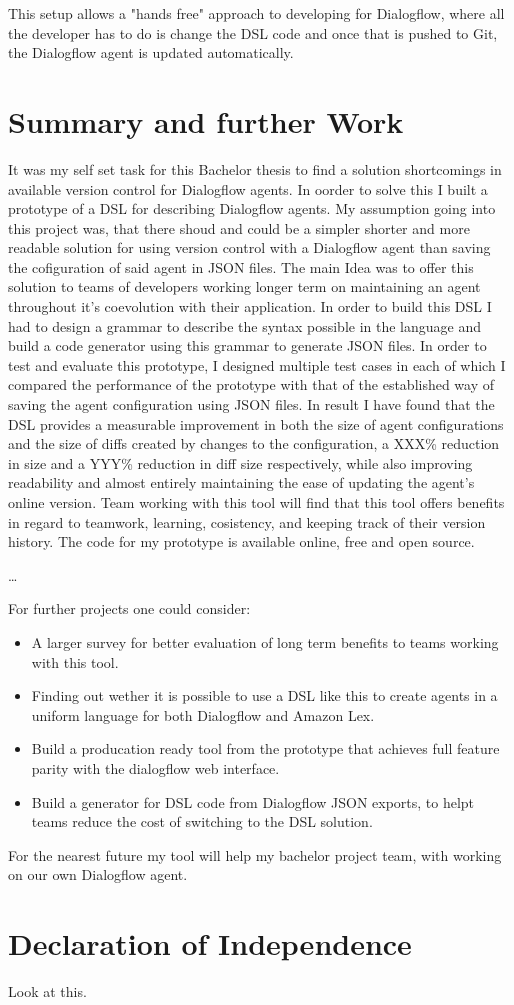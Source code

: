 This setup allows a "hands free" approach to developing for Dialogflow, where all the developer has to do is change the DSL code and once that is pushed to Git, the Dialogflow agent is updated automatically.


\chapter{Summary and further Work}

It was my self set task for this Bachelor thesis to find a solution shortcomings in available version control for Dialogflow agents. In oorder to solve this I built a prototype of a DSL for describing Dialogflow agents.
My assumption going into this project was, that there shoud and could be a simpler shorter and more readable solution for using version control with a Dialogflow agent than saving the cofiguration of said agent in JSON files.
The main Idea was to offer this solution to teams of developers working longer term on maintaining an agent throughout it's coevolution with their application.
In order to build this DSL I had to design a grammar to describe the syntax possible in the language and build a code generator using this grammar to generate JSON files.
In order to test and evaluate this prototype, I designed multiple test cases in each of which I compared the performance of the prototype with that of the established way of saving the agent configuration using JSON files.
In result I have found that the DSL provides a measurable improvement in both the size of agent configurations and the size of diffs created by changes to the configuration, a XXX\% reduction in size and a YYY\% reduction in diff size respectively, while also improving readability and almost entirely maintaining the ease of updating the agent's online version.
Team working with this tool will find that this tool offers benefits in regard to teamwork, learning, cosistency, and keeping track of their version history.
The code for my prototype is available online, free and open source.

\dots


For further projects one could consider:
\begin{itemize}
    \item A larger survey for better evaluation of long term benefits to teams working with this tool.
    \item Finding out wether it is possible to use a DSL like this to create agents in a uniform language for both Dialogflow and Amazon Lex.
    \item Build a producation ready tool from the prototype that achieves full feature parity with the dialogflow web interface.
    \item Build a generator for DSL code from Dialogflow JSON exports, to helpt teams reduce the cost of switching to the DSL solution.
\end{itemize}

For the nearest future my tool will help my bachelor project team, with working on our own Dialogflow agent.


\chapter{Declaration of Independence}
Look at this.\cite{stackups} 
